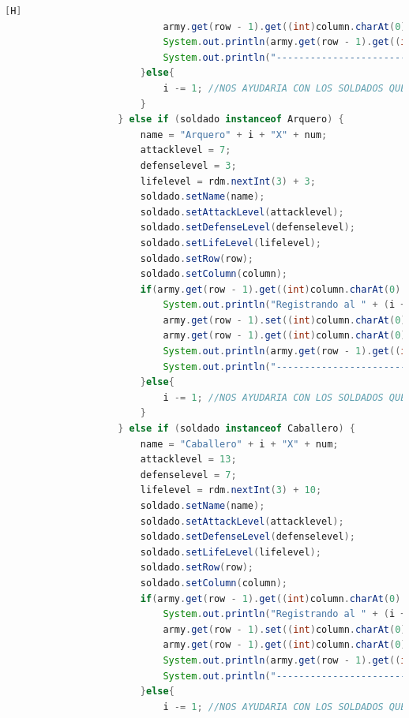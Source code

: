 \documentclass{article}
\begin{document}
\begin{lstlisting}[language=java,caption={Las lineas de codigos de la clase Mapa creada:}][H]
							army.get(row - 1).get((int)column.charAt(0) - 65).setSpeed(speed);
							System.out.println(army.get(row - 1).get((int)column.charAt(0) - 65).toString());
							System.out.println("---------------------------------");
						}else{
							i -= 1; //NOS AYUDARIA CON LOS SOLDADOS QUE SE REPITEN EN EL MISMO CASILLERO CON TAL QUE NO DEBERIA CONTAR 
						}
					} else if (soldado instanceof Arquero) {
						name = "Arquero" + i + "X" + num; 
						attacklevel = 7;
						defenselevel = 3;
						lifelevel = rdm.nextInt(3) + 3; 
						soldado.setName(name);                  
						soldado.setAttackLevel(attacklevel);
						soldado.setDefenseLevel(defenselevel);                    
						soldado.setLifeLevel(lifelevel);
						soldado.setRow(row);
						soldado.setColumn(column);
						if(army.get(row - 1).get((int)column.charAt(0) - 65) == null){
							System.out.println("Registrando al " + (i + 1) + " soldado del Ejercito " + armyespe + "");
							army.get(row - 1).set((int)column.charAt(0) - 65, new Arquero(name, attacklevel, defenselevel, lifelevel, speed, "Arquero", true, row, column, attacklevel));
							army.get(row - 1).get((int)column.charAt(0) - 65).setSpeed(speed);
							System.out.println(army.get(row - 1).get((int)column.charAt(0) - 65).toString());
							System.out.println("---------------------------------");
						}else{
							i -= 1; //NOS AYUDARIA CON LOS SOLDADOS QUE SE REPITEN EN EL MISMO CASILLERO CON TAL QUE NO DEBERIA CONTAR 
						}
					} else if (soldado instanceof Caballero) {
						name = "Caballero" + i + "X" + num; 
						attacklevel = 13;
						defenselevel = 7;
						lifelevel = rdm.nextInt(3) + 10; 
						soldado.setName(name);                  
						soldado.setAttackLevel(attacklevel);
						soldado.setDefenseLevel(defenselevel);                    
						soldado.setLifeLevel(lifelevel);
						soldado.setRow(row);
						soldado.setColumn(column);
						if(army.get(row - 1).get((int)column.charAt(0) - 65) == null){
							System.out.println("Registrando al " + (i + 1) + " soldado del Ejercito " + armyespe + "");
							army.get(row - 1).set((int)column.charAt(0) - 65, new Caballero(name, attacklevel, defenselevel, lifelevel, speed, "Caballero", true, row, column, false));
							army.get(row - 1).get((int)column.charAt(0) - 65).setSpeed(speed);
							System.out.println(army.get(row - 1).get((int)column.charAt(0) - 65).toString());
							System.out.println("---------------------------------");
						}else{
							i -= 1; //NOS AYUDARIA CON LOS SOLDADOS QUE SE REPITEN EN EL MISMO CASILLERO CON TAL QUE NO DEBERIA CONTAR 

\end{lstlisting}
\end{document}
